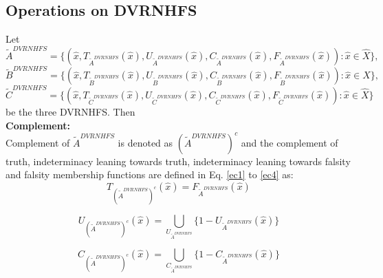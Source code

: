 \documentclass[a4paper]{elsarticle}
\begin{document}
{ \subsection{ Operations on DVRNHFS}\label{ope}
Let
\begin{equation*}\tilde{A}^{DVRNHFS}=\{(\hat{x},T_{\tilde{A}^{DVRNHFS}}(\hat{x}),U_{\tilde{A}^{DVRNHFS}}(\hat{x}),C_{\tilde{A}^{DVRNHFS}}(\hat{x}),F_{\tilde{A}^{DVRNHFS}}(\hat{x})) : \hat{x} \in \hat{X}\},\end{equation*}
\begin{equation*}
\tilde{B}^{DVRNHFS}=\{(\hat{x},T_{\tilde{B}^{DVRNHFS}}(\hat{x}),U_{\tilde{B}^{DVRNHFS}}(\hat{x}),C_{\tilde{B}^{DVRNHFS}}(\hat{x}),F_{\tilde{B}^{DVRNHFS}}(\hat{x})) : \hat{x} \in \hat{X}\}, \end{equation*}
\begin{equation*}\tilde{C}^{DVRNHFS}=\{(\hat{x},T_{\tilde{C}^{DVRNHFS}}(\hat{x}),U_{\tilde{C}^{DVRNHFS}}(\hat{x}),C_{\tilde{C}^{DVRNHFS}}(\hat{x}),F_{\tilde{C}^{DVRNHFS}}(\hat{x})) : \hat{x} \in \hat{X}\}\end{equation*}
be the three DVRNHFS. Then\\
 \textbf{Complement:}\\
 Complement of $\tilde{A}^{DVRNHFS}$ is denoted as $(\tilde{A}^{DVRNHFS})^{c}$ and the complement of truth, indeterminacy leaning towards truth, indeterminacy leaning towards falsity and falsity membership functions are defined in Eq. \ref{ec1} to \ref{ec4} as:
\begin{equation}
\label{ec1}
T_{(\tilde{A}^{DVRNHFS})^c}(\hat{x})=F_{\tilde{A}^{DVRNHFS}}(\hat{x})
\end{equation}

\begin{equation}
\label{ec2}
U_{(\tilde{A}^{DVRNHFS})^c}(\hat{x})=\bigcup_{U_{\tilde{A}^{DVRNHFS}}}\{1-U_{\tilde{A}^{DVRNHFS}}(\hat{x})\}
\end{equation}

\begin{equation}
\label{ec3}
C_{(\tilde{A}^{DVRNHFS})^c}(\hat{x})=\bigcup_{C_{\tilde{A}^{DVRNHFS}}}\{1-C_{\tilde{A}^{DVRNHFS}}(\hat{x})\}
\end{equation}

}
\end{document}

